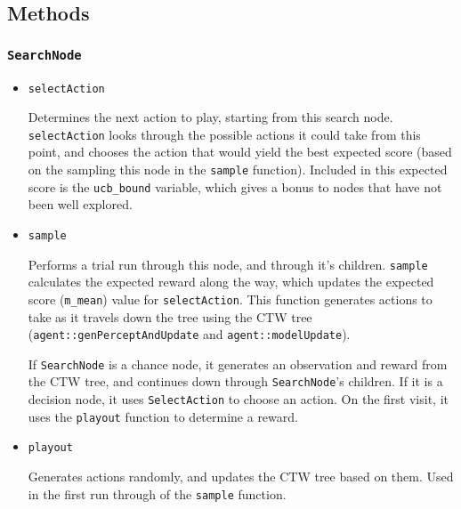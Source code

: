 \documentclass[pdftex,twoside,a4paper]{report}
\begin{document}
\subsection{Methods}

\subsubsection*{\texttt{SearchNode}}
\begin{itemize}
	\item{\texttt{selectAction}
	
	Determines the next action to play, starting from this search node. \texttt{selectAction} looks through the possible actions it could take from this point, and chooses the action that would yield the best expected score (based on the sampling this node in the \texttt{sample} function). Included in this expected score is the \texttt{ucb\_bound} variable, which gives a bonus to nodes that have not been well explored.
	}
	
	\item{\texttt{sample}
	
	Performs a trial run through this node, and through it's children. \texttt{sample} calculates the expected reward along the way, which updates the expected score (\texttt{m\_mean}) value for \texttt{selectAction}. This function generates actions to take as it travels down the tree using the CTW tree (\texttt{agent::genPerceptAndUpdate} and \texttt{agent::modelUpdate}).
	
	If \texttt{SearchNode} is a chance node, it generates an observation and reward from the CTW tree, and continues down through \texttt{SearchNode}'s children. If it is a decision node, it uses \texttt{SelectAction} to choose an action. On the first visit, it uses the \texttt{playout} function to determine a reward.
	}
	
	\item{\texttt{playout}
	
	Generates actions randomly, and updates the CTW tree based on them. Used in the first run through of the \texttt{sample} function. 
	}
\end{itemize}
\end{document}

